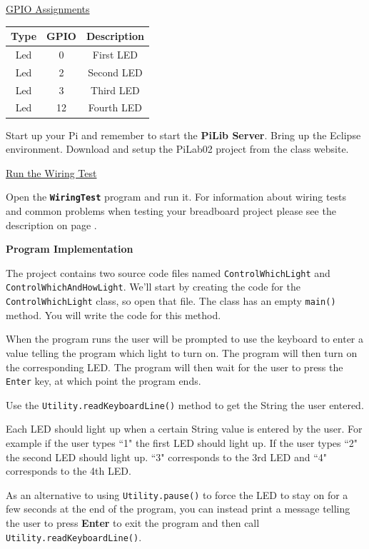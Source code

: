\underline{GPIO Assignments}

\begin{center}
	\begin{tabular}{c | c | c}
		\hline
		\textbf{Type} & \textbf{GPIO} & \textbf{Description} \\ \hline
		Led & 0 & First LED \\ 
		\hline
		Led & 2 & Second LED \\ 
		\hline
		Led & 3 & Third LED \\ 
		\hline
		Led & 12 & Fourth LED \\ 
		\hline	
	\end{tabular}
\end{center}

\vspace{10pt}

Start up your Pi and remember to start the \textbf{PiLib Server}. Bring up the Eclipse environment. Download and setup the PiLab02 project from the class website.

\underline{Run the Wiring Test}

Open the \textbf{\texttt{WiringTest}} program and run it. For information about wiring tests and common problems when testing your breadboard project please see the description on page \pageref{wiringTestDescription}.

\textbf{Program Implementation}

The project contains two source code files named \texttt{ControlWhichLight} and \texttt{ControlWhichAndHowLight}. We'll start by creating the code for the \texttt{ControlWhichLight} class, so open that file. The class has an empty \texttt{main()} method. You will write the code for this method.

When the program runs the user will be prompted to use the keyboard to enter a value telling the program which light to turn on. The program will then turn on the corresponding LED. The program will then wait for the user to press the \texttt{Enter} key, at which point the program ends.

Use the \texttt{Utility.readKeyboardLine()} method to get the String the user entered.

Each LED should light up when a certain String value is entered by the user. For example if the user types ``1" the first LED should light up. If the user types ``2" the second LED should light up. ``3" corresponds to the 3rd LED and ``4" corresponds to the 4th LED.

As an alternative to using \texttt{Utility.pause()} to force the LED to stay on for a few seconds at the end of the program, you can instead print a message telling the user to press \textbf{Enter} to exit the program and then call \texttt{Utility.readKeyboardLine()}.

